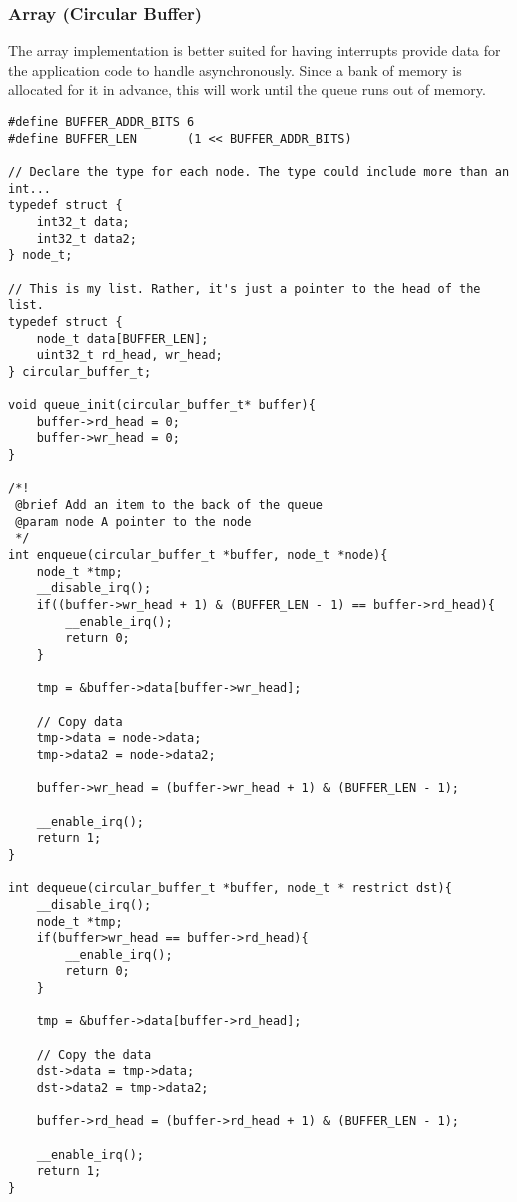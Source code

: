 \documentclass[10pt]{article}
\begin{document}
\subsubsection*{Array (Circular Buffer)}
The array implementation is better suited for having interrupts provide data for the application code to handle asynchronously. Since a bank of memory is allocated for it in advance, this will work until the queue runs out of memory.

\begin{lstlisting}[label=lst-circular-buffer-queue,caption=Circular buffer queue]
#define BUFFER_ADDR_BITS 6
#define BUFFER_LEN       (1 << BUFFER_ADDR_BITS)

// Declare the type for each node. The type could include more than an int...
typedef struct {
	int32_t data;
	int32_t data2;
} node_t;

// This is my list. Rather, it's just a pointer to the head of the list.
typedef struct {
	node_t data[BUFFER_LEN];
	uint32_t rd_head, wr_head;
} circular_buffer_t;

void queue_init(circular_buffer_t* buffer){
	buffer->rd_head = 0;
	buffer->wr_head = 0;
}

/*!
 @brief Add an item to the back of the queue
 @param node A pointer to the node
 */
int enqueue(circular_buffer_t *buffer, node_t *node){
	node_t *tmp;
	__disable_irq();
	if((buffer->wr_head + 1) & (BUFFER_LEN - 1) == buffer->rd_head){
		__enable_irq();
		return 0;
	}
	
	tmp = &buffer->data[buffer->wr_head];

	// Copy data
	tmp->data = node->data;
	tmp->data2 = node->data2;
	
	buffer->wr_head = (buffer->wr_head + 1) & (BUFFER_LEN - 1);
	
	__enable_irq();
	return 1;
}

int dequeue(circular_buffer_t *buffer, node_t * restrict dst){
	__disable_irq();
	node_t *tmp;
	if(buffer>wr_head == buffer->rd_head){
		__enable_irq();
		return 0;
	}
	
	tmp = &buffer->data[buffer->rd_head];
	
	// Copy the data
	dst->data = tmp->data;
	dst->data2 = tmp->data2;
	
	buffer->rd_head = (buffer->rd_head + 1) & (BUFFER_LEN - 1);
	
	__enable_irq();
	return 1;
}

\end{lstlisting}
\end{document}
